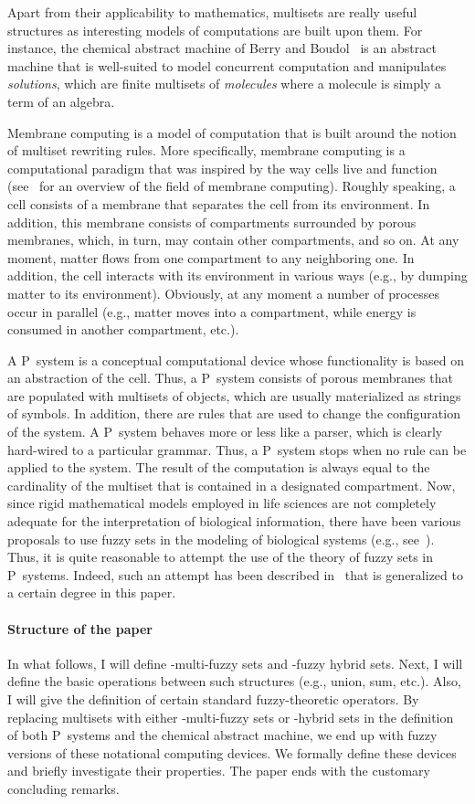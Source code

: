 \documentclass{amsart}
\theoremstyle{definition}
\begin{document}
Apart from their applicability to mathematics, multisets are really
useful structures as interesting models of computations are built upon them.
For instance, the chemical abstract machine of Berry and Boudol~\cite{cham}
is an abstract machine that is well-suited to model
concurrent computation and manipulates {\em solutions}, which are finite
multisets of {\em molecules} where a molecule is simply a term of an algebra.

Membrane computing is a model of computation that is built around 
the notion of multiset rewriting rules. More specifically, membrane computing 
is a computational paradigm that  was inspired by the way cells live and 
function (see~\cite{paun02} for an overview of the field of membrane 
computing). Roughly speaking, a cell consists of a membrane that separates the
cell from its environment. In addition, this membrane consists 
of compartments surrounded by porous membranes, which, in turn, may contain other 
compartments, and so on. At any moment, matter flows from one compartment to 
any neighboring one. In addition, the cell interacts with its environment in 
various ways (e.g., by dumping matter to its environment). Obviously, at any 
moment a number of processes occur in parallel (e.g., matter moves into a 
compartment, while energy is consumed in another compartment, etc.).

A P~system is a conceptual computational device whose functionality is based on an 
abstraction of the cell. Thus, a P~system consists of porous membranes that are 
populated with multisets of objects, which are usually materialized as strings
of symbols. In addition, there are rules that are used to change the 
configuration of the system. A P~system behaves more or less like a parser, 
which is clearly hard-wired to a particular grammar. Thus, a P~system stops 
when no rule can be applied to the system. The result of the computation is 
always equal to the cardinality of the multiset that is contained in a 
designated compartment. Now, since rigid mathematical models employed in life 
sciences are not completely adequate for the interpretation of biological 
information, there have been various proposals to use fuzzy sets in the 
modeling of biological systems (e.g., see~\cite{akay97,baum98}). Thus, it is 
quite reasonable to attempt the use of the theory of fuzzy sets in P~systems. 
Indeed, such an attempt has been described in~\cite{syropoulos06} that
is generalized to a certain degree in this paper.

\paragraph{Structure of the paper} In what follows, I will define 
-multi-fuzzy sets and -fuzzy hybrid sets. Next, I will define the basic 
operations between such structures (e.g., union, sum, etc.). Also, I  will 
give the definition of certain  standard fuzzy-theoretic operators. By
replacing multisets with either -multi-fuzzy sets or -hybrid sets in the
definition of both P~systems and the chemical abstract machine, we end up with
fuzzy versions of these notational computing devices. We formally define
these devices and briefly investigate their properties. The paper ends 
with the customary concluding remarks.
\end{document}
